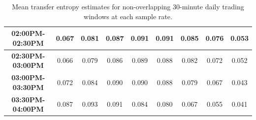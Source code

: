 \begin{table}
{\begin{tabular}{|c|c|c|c|c|c|c|c|c|}
\textbf{02:00PM-02:30PM}                   & 0.067             & 0.081              & 0.087              & 0.091              & 0.091              & 0.085               & 0.076               & 0.053               \\ \hline
\textbf{02:30PM-03:00PM}                   & 0.066             & 0.079              & 0.086              & 0.089              & 0.088              & 0.082               & 0.072               & 0.052               \\ \hline
\textbf{03:00PM-03:30PM}                   & 0.072             & 0.084              & 0.090              & 0.090              & 0.088              & 0.079               & 0.067               & 0.043               \\ \hline
\textbf{03:30PM-04:00PM}                   & 0.087             & 0.093              & 0.091              & 0.084              & 0.080              & 0.067               & 0.055               & 0.041               \\ \hline
\end{tabular}}
\caption{Mean transfer entropy estimates for non-overlapping 30-minute daily trading windows at each sample rate.}
\label{tab:TEMean30MinWindows}
\end{table}

